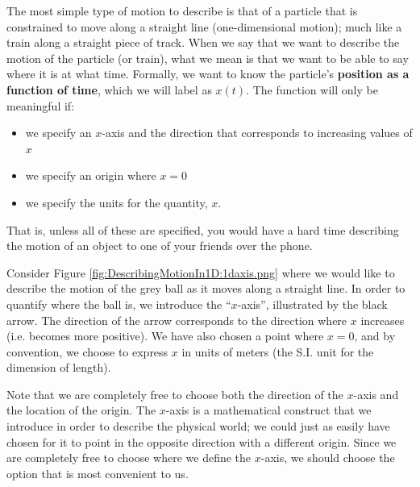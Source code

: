 The most simple type of motion to describe is that of a particle that is constrained to move along a straight line (one-dimensional motion); much like a train along a straight piece of track. When we say that we want to describe the motion of the particle (or train), what we mean is that we want to be able to say where it is at what time. Formally, we want to know the particle's \textbf{position as a function of time}, which we will label as $x(t)$. The function will only be meaningful if:
\begin{itemize}
\item we specify an $x$-axis and the direction that corresponds to increasing values of $x$
\item we specify an origin where $x=0$
\item we specify the units for the quantity, $x$.
\end{itemize}
That is, unless all of these are specified, you would have a hard time describing the motion of an object to one of your friends over the phone. 

Consider Figure \ref{fig:DescribingMotionIn1D:1daxis.png} where we would like to describe the motion of the grey ball as it moves along a straight line. In order to quantify where the ball is, we introduce the ``$x$-axis'', illustrated by the black arrow. The direction of the arrow corresponds to the direction where $x$ increases (i.e. becomes more positive). We have also chosen a point where $x=0$, and by convention, we choose to express $x$ in units of meters (the S.I. unit for the dimension of length).

Note that we are completely free to choose both the direction of the $x$-axis and the location of the origin. The $x$-axis is a mathematical construct that we introduce in order to describe the physical world; we could just as easily have chosen for it to point in the opposite direction with a different origin. Since we are completely free to choose where we define the $x$-axis, we should choose the option that is most convenient to us. 

